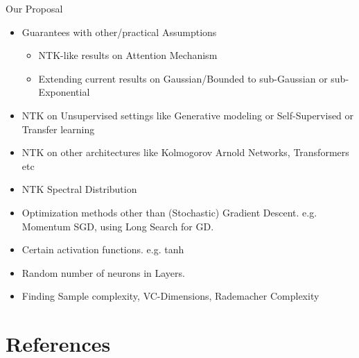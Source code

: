 \documentclass[serif, aspectratio=169]{beamer}
\begin{document}
\begin{frame}{Our Proposal}
\begin{itemize}
	\item Guarantees with other/practical Assumptions
	\begin{itemize}
		\item NTK-like results on Attention Mechanism
		\item Extending current results on Gaussian/Bounded to sub-Gaussian or sub-Exponential
	\end{itemize}
	\item NTK on Unsupervised settings like Generative modeling or Self-Supervised or Transfer learning
	
	\item NTK on other architectures like Kolmogorov Arnold Networks, Transformers etc

\item  NTK Spectral Distribution
\item Optimization methods other than (Stochastic) Gradient Descent. e.g. Momentum SGD, using Long Search for GD.
\item Certain activation functions. e.g. tanh
\item Random number of neurons in Layers.
\item Finding Sample complexity, VC-Dimensions, Rademacher Complexity
\end{itemize}
\end{frame}


\section{References}

%    


\begin{frame}[allowframebreaks]
   \nocite{*} %
\end{frame}
\end{document}
